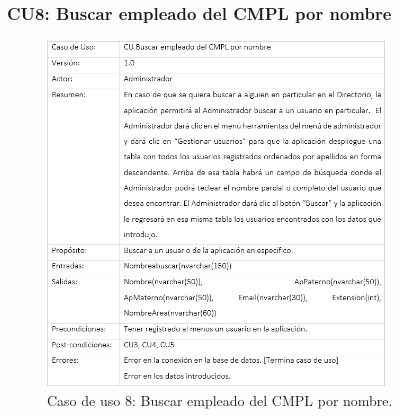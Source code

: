 \newpage
			
		\subsubsection{CU8: Buscar empleado del CMPL por nombre}
			\begin{figure}[htbp!]
				\centering
					\includegraphics[width=0.8\textwidth]{images/CU/CU8}
					\caption{Caso de uso 8: Buscar empleado del CMPL por nombre.}
				\label{Tabla}
			\end{figure}
			
